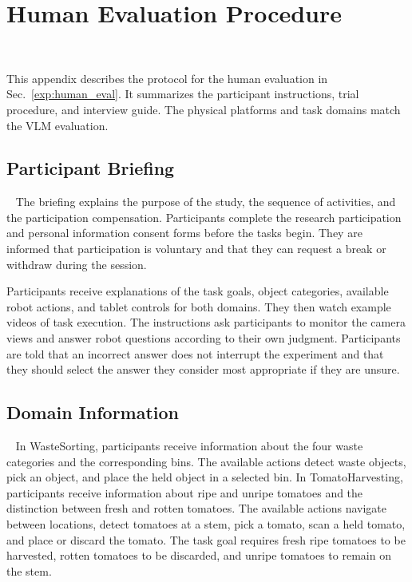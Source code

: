 \section{Human Evaluation Procedure}~\label{appx:user}

This appendix describes the protocol for the human evaluation in Sec.~\ref{exp:human_eval}. It summarizes the participant instructions, trial procedure, and interview guide. The physical platforms and task domains match the VLM evaluation.

\subsection{Participant Briefing}~\label{appx:user_briefing}
The briefing explains the purpose of the study, the sequence of activities, and the participation compensation. Participants complete the research participation and personal information consent forms before the tasks begin. They are informed that participation is voluntary and that they can request a break or withdraw during the session.

Participants receive explanations of the task goals, object categories, available robot actions, and tablet controls for both domains. They then watch example videos of task execution. The instructions ask participants to monitor the camera views and answer robot questions according to their own judgment. Participants are told that an incorrect answer does not interrupt the experiment and that they should select the answer they consider most appropriate if they are unsure.

\subsection{Domain Information}~\label{appx:user_scenarios}
In WasteSorting, participants receive information about the four waste categories and the corresponding bins. The available actions detect waste objects, pick an object, and place the held object in a selected bin. In TomatoHarvesting, participants receive information about ripe and unripe tomatoes and the distinction between fresh and rotten tomatoes. The available actions navigate between locations, detect tomatoes at a stem, pick a tomato, scan a held tomato, and place or discard the tomato. The task goal requires fresh ripe tomatoes to be harvested, rotten tomatoes to be discarded, and unripe tomatoes to remain on the stem.

